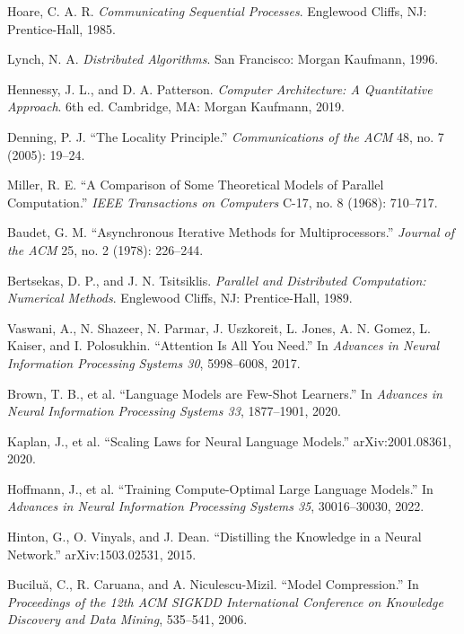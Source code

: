 \documentclass[11pt]{article}
\begin{document}
Hoare, C. A. R.
\textit{Communicating Sequential Processes}.
Englewood Cliffs, NJ: Prentice-Hall, 1985.

Lynch, N. A.
\textit{Distributed Algorithms}.
San Francisco: Morgan Kaufmann, 1996.

Hennessy, J. L., and D. A. Patterson.
\textit{Computer Architecture: A Quantitative Approach}.
6th ed. Cambridge, MA: Morgan Kaufmann, 2019.

Denning, P. J.
``The Locality Principle.''
\textit{Communications of the ACM} 48, no. 7 (2005): 19--24.

Miller, R. E.
``A Comparison of Some Theoretical Models of Parallel Computation.''
\textit{IEEE Transactions on Computers} C-17, no. 8 (1968): 710--717.

Baudet, G. M.
``Asynchronous Iterative Methods for Multiprocessors.''
\textit{Journal of the ACM} 25, no. 2 (1978): 226--244.

Bertsekas, D. P., and J. N. Tsitsiklis.
\textit{Parallel and Distributed Computation: Numerical Methods}.
Englewood Cliffs, NJ: Prentice-Hall, 1989.

Vaswani, A., N. Shazeer, N. Parmar, J. Uszkoreit, L. Jones,
A. N. Gomez, L. Kaiser, and I. Polosukhin.
``Attention Is All You Need.''
In \textit{Advances in Neural Information Processing Systems 30},
5998--6008, 2017.

Brown, T. B., et al.
``Language Models are Few-Shot Learners.''
In \textit{Advances in Neural Information Processing Systems 33},
1877--1901, 2020.

Kaplan, J., et al.
``Scaling Laws for Neural Language Models.''
arXiv:2001.08361, 2020.

Hoffmann, J., et al.
``Training Compute-Optimal Large Language Models.''
In \textit{Advances in Neural Information Processing Systems 35},
30016--30030, 2022.

Hinton, G., O. Vinyals, and J. Dean.
``Distilling the Knowledge in a Neural Network.''
arXiv:1503.02531, 2015.

Bucilu\u{a}, C., R. Caruana, and A. Niculescu-Mizil.
``Model Compression.''
In \textit{Proceedings of the 12th ACM SIGKDD International Conference
on Knowledge Discovery and Data Mining}, 535--541, 2006.
\end{document}
